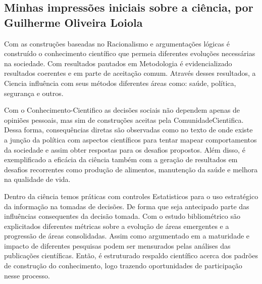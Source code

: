 \subsection{Minhas impressões iniciais sobre a ciência, por Guilherme Oliveira Loiola}

Com as construções baseadas no \gls{Racionalismo} e argumentações lógicas é construído o conhecimento científico que permeia diferentes evoluções necessárias na sociedade. Com resultados pautados em \gls{Metodologia} é evidencializado resultados coerentes e em parte de aceitação comum. Através desses resultados, a \gls{Ciencia} influência com seus métodos diferentes áreas como: saúde, política, segurança e outros. 

Com o \gls{Conhecimento-Cientifico} as decisões sociais não dependem apenas de opiniões pessoais, mas sim de construções aceitas pela \gls{ComunidadeCientifica}. Dessa forma, consequências diretas são observadas como no texto de \citet{frickel_new_2006} onde existe a junção da política com aspectos científicos para tentar mapear comportamentos da sociedade e assim obter respostas para os desafios propostos. Além disso, é exemplificado a eficácia da ciência também com a geração de resultados em desafios recorrentes como produção de alimentos, manutenção da saúde e melhora na qualidade de vida.  

Dentro da ciência temos práticas com controles \gls{Estatisticos} para o uso estratégico da informação na tomadas de decisões. De forma que seja antecipado parte das influências consequentes da decisão tomada. Com o estudo bibliométrico são explicitados diferentes métricas sobre a evolução de áreas emergentes e a progressão de áreas consolidadas. Assim como argumentado em \citet{santa_soriano_bibliometric_2018} a maturidade e impacto de diferentes pesquisas podem ser mensurados pelas análises das publicações científicas. Então, é estruturado respaldo científico acerca dos padrões de construção do conhecimento, logo trazendo oportunidades de participação nesse processo.

